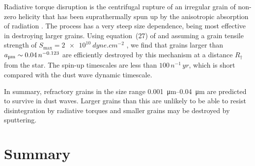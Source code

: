 Radiative torque disruption \citep{Hoang:2018a} is the centrifugal
rupture of an irregular grain of non-zero helicity that has been
suprathermally spun up by the anisotropic absorption of radiation
\citep{Dolginov:1976a, Draine:1996b, Lazarian:2007a}.  The process has
a very steep size dependence, being most effective in destroying
larger grains.  Using equation~(27) of \citet{Hoang:2018a} and
assuming a grain tensile strength of
\(S_{\text{max}} = \SI{2e10}{dyne.cm^{-2}}\) \citetext{\S~2.4 of
  \citealp{Borkowski:1995a}}, we find that grains larger than
\(\amu \sim 0.04\, n^{-0.123}\) are efficiently destroyed by this
mechanism at a distance \(R_\dag\) from the star. The spin-up timescales
are less than \(100\, n^{-1}\,\si{yr}\), which is short compared with
the dust wave dynamic timescale.

In summary, refractory grains in the size range
\SIrange{0.001}{0.04}{\um} are predicted to survive in dust waves.
Larger grains than this are unlikely to be able to resist
disintegration by radiative torques and smaller grains may be
destroyed by sputtering.







\section{Summary}
\label{sec:summary}

